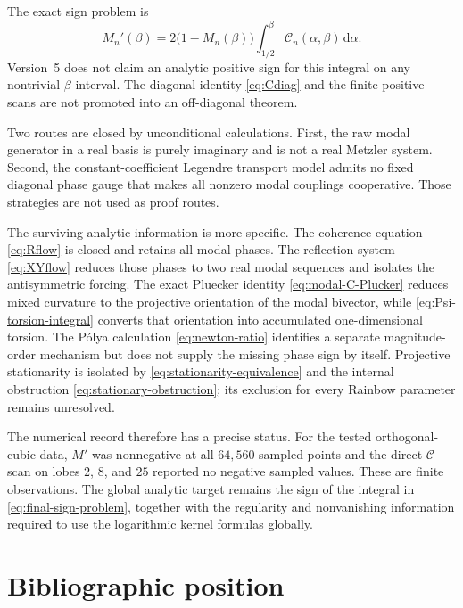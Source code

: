 \documentclass[11pt]{amsart}
\numberwithin{equation}{section}
\theoremstyle{plain}
\theoremstyle{definition}
\theoremstyle{remark}
\newcommand{\Ccal}{\mathcal C}
\newcommand{\dd}{\,\mathrm d}
\begin{document}
The exact sign problem is
\begin{equation}
\boxed{
M_n'(\beta)
=2\bigl(1-M_n(\beta)\bigr)
\int_{1/2}^{\beta}\Ccal_n(\alpha,\beta)\dd\alpha.
}
\label{eq:final-sign-problem}
\end{equation}
Version~5 does not claim an analytic positive sign for this integral on any nontrivial $\beta$ interval.  The diagonal identity \eqref{eq:Cdiag} and the finite positive scans are not promoted into an off-diagonal theorem.

Two routes are closed by unconditional calculations.  First, the raw modal generator in a real basis is purely imaginary and is not a real Metzler system.  Second, the constant-coefficient Legendre transport model admits no fixed diagonal phase gauge that makes all nonzero modal couplings cooperative.  Those strategies are not used as proof routes.

The surviving analytic information is more specific.  The coherence equation \eqref{eq:Rflow} is closed and retains all modal phases.  The reflection system \eqref{eq:XYflow} reduces those phases to two real modal sequences and isolates the antisymmetric forcing.  The exact Pluecker identity \eqref{eq:modal-C-Plucker} reduces mixed curvature to the projective orientation of the modal bivector, while \eqref{eq:Psi-torsion-integral} converts that orientation into accumulated one-dimensional torsion.  The P\'olya calculation \eqref{eq:newton-ratio} identifies a separate magnitude-order mechanism but does not supply the missing phase sign by itself.  Projective stationarity is isolated by \eqref{eq:stationarity-equivalence} and the internal obstruction \eqref{eq:stationary-obstruction}; its exclusion for every Rainbow parameter remains unresolved.

The numerical record therefore has a precise status.  For the tested orthogonal-cubic data, $M'$ was nonnegative at all $64{,}560$ sampled points and the direct $\Ccal$ scan on lobes $2$, $8$, and $25$ reported no negative sampled values.  These are finite observations.  The global analytic target remains the sign of the integral in \eqref{eq:final-sign-problem}, together with the regularity and nonvanishing information required to use the logarithmic kernel formulas globally.

\section{Bibliographic position}
\label{sec:bibliography-position}
\end{document}
